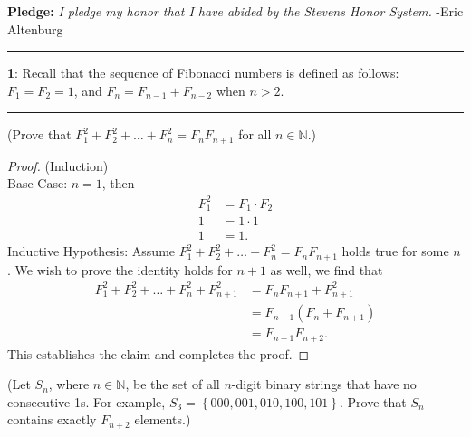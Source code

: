 \documentclass[11pt]{article}
\newcommand\question[2]{\vspace{.25in}\hrule\textbf{#1}: #2\vspace{.5em}\hrule\vspace{.10in}}
\renewcommand\part[1]{\vspace{.10in}(#1)\par}
\newcommand{\N}{\mathbb{N}}
\begin{document}
\raggedright
\newcommand\NAME{Eric Altenburg}  %
\newcommand\COURSE{MA-240}
\newcommand\HWNUM{4}              %


\textbf{Pledge:} \textit{I pledge my honor that I have abided by the Stevens Honor System.} -Eric Altenburg

\question{1}{Recall that the sequence of Fibonacci numbers is defined as follows: $F_1 = F_2 = 1$, and $F_n = F_{n-1}+F_{n-2}$ when $n > 2$.}

\part{Prove that $F_1^2+F_2^2+ \ldots + F_n^2 = F_nF_{n+1}$ for all $n \in \N$.}
	\begin{proof}
		(Induction)\\
		Base Case: $n = 1$, then
		\begin{align*}
			F_1^2 &= F_1 \cdot F_{2}\\
			1 &= 1 \cdot 1\\
			1 &= 1.
		\end{align*}
		Inductive Hypothesis: Assume $F_1^2+F_2^2+ \ldots + F_n^2 = F_nF_{n+1}$ holds true for some $n$. We wish to prove the identity holds for $n+1$ as well, we find that
		\begin{align*}
			F_1^2+F_2^2+ \ldots + F_n^2 + F_{n+1}^2 &= F_nF_{n+1} + F_{n+1}^2\\
			&= F_{n+1} \left(F_n + F_{n+1}\right)\\
			&= F_{n+1} F_{n+2}.
		\end{align*}
		This establishes the claim and completes the proof.
	\end{proof}

\part{Let $S_n$, where $n\in \N$, be the set of all $n$-digit binary strings that have no consecutive 1s. For example, $S_3 = \left\{000, 001, 010, 100, 101\right\}.$ Prove that $S_n$ contains exactly $F_{n+2}$ elements.}
\end{document}

